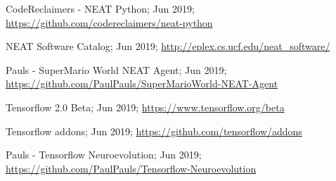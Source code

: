 \documentclass[journal, a4paper]{IEEEtran}
\begin{document}
\begin{thebibliography}{5}
    CodeReclaimers - NEAT Python; Jun 2019;
    \url{https://github.com/codereclaimers/neat-python}

    NEAT Software Catalog; Jun 2019;
    \url{http://eplex.cs.ucf.edu/neat_software/}

    Pauls - SuperMario World NEAT Agent; Jun 2019;
    \url{https://github.com/PaulPauls/SuperMarioWorld-NEAT-Agent}

    Tensorflow 2.0 Beta; Jun 2019;
    \url{https://www.tensorflow.org/beta}

    Tensorflow addons; Jun 2019;
    \url{https://github.com/tensorflow/addons}

    Pauls - Tensorflow Neuroevolution; Jun 2019;
    \url{https://github.com/PaulPauls/Tensorflow-Neuroevolution}

\end{thebibliography}
\end{document}
